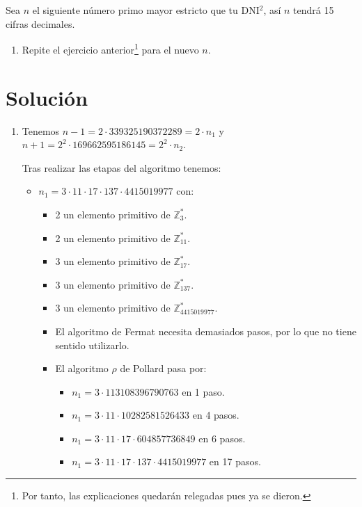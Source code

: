 	Sea $n$ el siguiente número primo mayor estricto que tu DNI$^2$, así $n$ tendrá 15 cifras decimales.
	\begin{enumerate}
		\item Repite el ejercicio anterior\footnote{Por tanto, las explicaciones quedarán relegadas pues ya se
		dieron.} para el nuevo $n$.
	\end{enumerate}
	
\section*{Solución}
	\begin{enumerate}
		\item Tenemos $n-1 = 2 \cdot 339325190372289 = 2 \cdot n_1$ y $n+1 = 2^2 \cdot 169662595186145 = 2^2 \cdot n_2$.
		
		Tras realizar las etapas del algoritmo tenemos:
		\begin{itemize}
			\item $n_1 = 3 \cdot 11 \cdot 17 \cdot 137 \cdot 4415019977$ con:
			\begin{itemize}
				\item 2 un elemento primitivo de $\mathbb{Z}^*_{3}$.
				\item 2 un elemento primitivo de $\mathbb{Z}^*_{11}$.
				\item 3 un elemento primitivo de $\mathbb{Z}^*_{17}$.
				\item 3 un elemento primitivo de $\mathbb{Z}^*_{137}$.
				\item 3 un elemento primitivo de $\mathbb{Z}^*_{4415019977}$.
				\item El algoritmo de Fermat necesita demasiados pasos, por lo que no tiene sentido utilizarlo.
				\item El algoritmo $\rho$ de Pollard pasa por:
				\begin{itemize}
					\item $n_1 = 3 \cdot 113108396790763$ en 1 paso.
					\item $n_1 = 3 \cdot 11 \cdot 10282581526433$ en 4 pasos.
					\item $n_1 = 3 \cdot 11 \cdot 17 \cdot 604857736849$ en 6 pasos.
					\item $n_1 = 3 \cdot 11 \cdot 17 \cdot 137 \cdot 4415019977$ en 17 pasos.
				\end{itemize}
			\end{itemize}
			

\end{itemize}
\end{enumerate}
